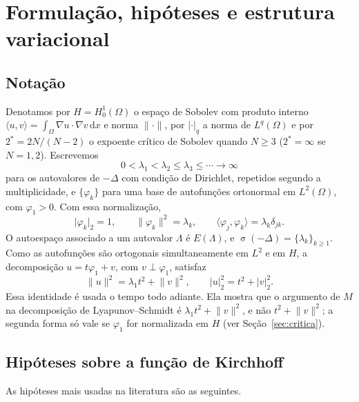 \documentclass[11pt,a4paper]{article}
\theoremstyle{plain}
\theoremstyle{definition}
\theoremstyle{remark}
\newcommand{\Hz}{H_0^1(\Omega)}
\newcommand{\norm}[1]{\lVert #1\rVert}
\newcommand{\abs}[1]{\lvert #1\rvert}
\newcommand{\dx}{\,\mathrm{d}x}
\DeclareMathOperator{\spec}{\sigma}
\begin{document}
\section{Formulação, hipóteses e estrutura variacional}\label{sec:formulacao}

\subsection{Notação}

Denotamos por $H=\Hz$ o espaço de Sobolev com produto interno
$\langle u,v\rangle=\int_\Omega\nabla u\cdot\nabla v\dx$ e norma $\norm{\cdot}$,
por $\abs{\cdot}_q$ a norma de $L^q(\Omega)$ e por $2^*=2N/(N-2)$ o expoente
crítico de Sobolev quando $N\ge3$ ($2^*=\infty$ se $N=1,2$). Escrevemos
\[
0<\lambda_1<\lambda_2\le\lambda_3\le\cdots\to\infty
\]
para os autovalores de $-\Delta$ com condição de Dirichlet, repetidos segundo a
multiplicidade, e $\{\varphi_k\}$ para uma base de autofunções ortonormal em
$L^2(\Omega)$, com $\varphi_1>0$. Com essa normalização,
\begin{equation}\label{eq:normalizacao}
\abs{\varphi_k}_2=1,\qquad \norm{\varphi_k}^2=\lambda_k,\qquad
\langle\varphi_j,\varphi_k\rangle=\lambda_k\delta_{jk}.
\end{equation}
O autoespaço associado a um autovalor $\Lambda$ é $E(\Lambda)$, e
$\spec(-\Delta)=\{\lambda_k\}_{k\ge1}$. Como as autofunções são ortogonais
simultaneamente em $L^2$ e em $H$, a decomposição
$u=t\varphi_1+v$, com $v\perp\varphi_1$, satisfaz
\begin{equation}\label{eq:pitagoras}
\norm{u}^2=\lambda_1t^2+\norm{v}^2,\qquad \abs{u}_2^2=t^2+\abs{v}_2^2.
\end{equation}
Essa identidade é usada o tempo todo adiante. Ela mostra que o argumento de
$M$ na decomposição de Lyapunov--Schmidt é $\lambda_1t^2+\norm{v}^2$, e não
$t^2+\norm{v}^2$; a segunda forma só vale se $\varphi_1$ for normalizada em
$H$ (ver Seção~\ref{sec:critica}).

\subsection{Hipóteses sobre a função de Kirchhoff}

As hipóteses mais usadas na literatura são as seguintes.
\end{document}
